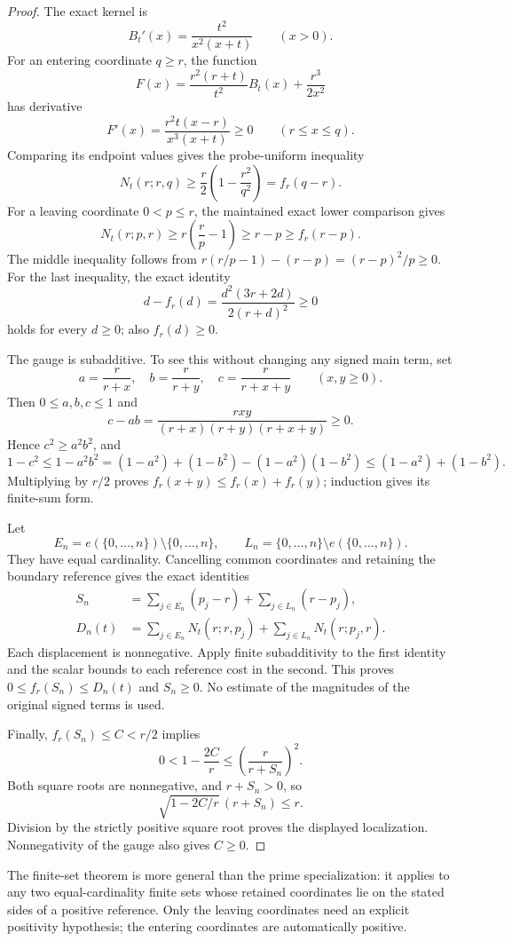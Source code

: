\documentclass[11pt]{article}
\theoremstyle{definition}
\begin{document}
\begin{proof}
The exact kernel is
\[
 B_t'(x)=\frac{t^2}{x^2(x+t)}\qquad(x>0).
\]
For an entering coordinate $q\ge r$, the function
\[
 F(x)=\frac{r^2(r+t)}{t^2}B_t(x)+\frac{r^3}{2x^2}
\]
has derivative
\[
 F'(x)=\frac{r^2t(x-r)}{x^3(x+t)}\ge0
       \qquad(r\le x\le q).
\]
Comparing its endpoint values gives the probe-uniform inequality
\[
 N_t(r;r,q)\ge\frac r2\left(1-\frac{r^2}{q^2}\right)
             =f_r(q-r).
\]
For a leaving coordinate $0<p\le r$, the maintained exact lower
comparison gives
\[
 N_t(r;p,r)\ge r\left(\frac rp-1\right)\ge r-p
             \ge f_r(r-p).
\]
The middle inequality follows from
$r(r/p-1)-(r-p)=(r-p)^2/p\ge0$. For the last inequality, the exact
identity
\[
 d-f_r(d)=\frac{d^2(3r+2d)}{2(r+d)^2}\ge0
\]
holds for every $d\ge0$; also $f_r(d)\ge0$.

The gauge is subadditive. To see this without changing any signed
main term, set
\[
 a=\frac r{r+x},\quad b=\frac r{r+y},\quad
 c=\frac r{r+x+y}\qquad(x,y\ge0).
\]
Then $0\le a,b,c\le1$ and
\[
 c-ab=\frac{rxy}{(r+x)(r+y)(r+x+y)}\ge0.
\]
Hence $c^2\ge a^2b^2$, and
\[
 1-c^2\le1-a^2b^2
  =(1-a^2)+(1-b^2)-(1-a^2)(1-b^2)
  \le(1-a^2)+(1-b^2).
\]
Multiplying by $r/2$ proves
$f_r(x+y)\le f_r(x)+f_r(y)$; induction gives its finite-sum form.

Let
\[
 E_n=e(\{0,\ldots,n\})\setminus\{0,\ldots,n\},\qquad
 L_n=\{0,\ldots,n\}\setminus e(\{0,\ldots,n\}).
\]
They have equal cardinality. Cancelling common coordinates and
retaining the boundary reference gives the exact identities
\[
 \begin{split}
 S_n&=\sum_{j\in E_n}(p_j-r)+\sum_{j\in L_n}(r-p_j),\\
 D_n(t)&=\sum_{j\in E_n}N_t(r;r,p_j)
          +\sum_{j\in L_n}N_t(r;p_j,r).
 \end{split}
\]
Each displacement is nonnegative. Apply finite subadditivity to the
first identity and the scalar bounds to each reference cost in the
second. This proves $0\le f_r(S_n)\le D_n(t)$ and $S_n\ge0$.
No estimate of the magnitudes of the original signed terms is used.

Finally, $f_r(S_n)\le C<r/2$ implies
\[
 0<1-\frac{2C}{r}\le
       \left(\frac r{r+S_n}\right)^2.
\]
Both square roots are nonnegative, and $r+S_n>0$, so
\[
 \sqrt{1-2C/r}\,(r+S_n)\le r.
\]
Division by the strictly positive square root proves the displayed
localization. Nonnegativity of the gauge also gives $C\ge0$.
\end{proof}

The finite-set theorem is more general than the prime specialization:
it applies to any two equal-cardinality finite sets whose retained
coordinates lie on the stated sides of a positive reference.
Only the leaving coordinates need an explicit positivity hypothesis;
the entering coordinates are automatically positive.
\end{document}
